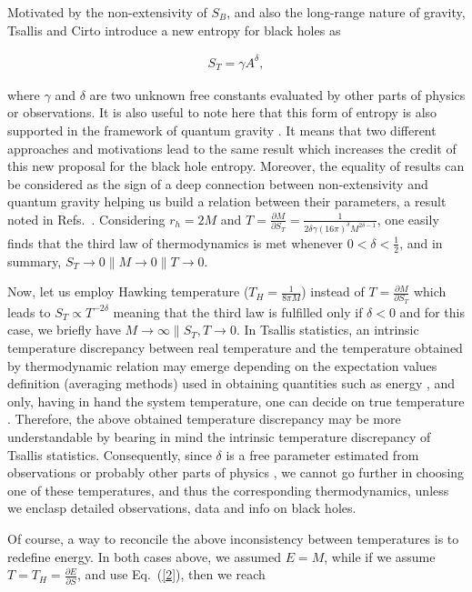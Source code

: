 \documentclass[twocolumn,preprintnumbers,amsmath,nofootinbib,amssymb]{revtex4}
\begin{document}
Motivated by the non-extensivity of $S_B$, and also the long-range
nature of gravity, Tsallis and Cirto \cite{tsallis} introduce a
new entropy for black holes as

\begin{eqnarray}\label{2}
S_T=\gamma A^\delta,
\end{eqnarray}

\noindent where $\gamma$ and $\delta$ are two unknown free
constants evaluated by other parts of physics or observations. It
is also useful to note here that this form of entropy is also
supported in the framework of quantum gravity \cite{barrow}. It
means that two different approaches and motivations lead to the
same result which increases the credit of this new proposal for
the black hole entropy. Moreover, the equality of results can be
considered as the sign of a deep connection between
non-extensivity and quantum gravity helping us build a relation
between their parameters, a result noted in Refs.~\cite{epl,homa}.
Considering $r_h=2M$ and $T=\frac{\partial M}{\partial
S_T}=\frac{1}{2\delta\gamma(16\pi)^\delta M^{2\delta-1}}$, one
easily finds that the third law of thermodynamics is met whenever
$0<\delta<\frac{1}{2}$, and in summary, $S_T\rightarrow0\parallel
M\rightarrow0\parallel T\rightarrow0$.

Now, let us employ Hawking temperature ($T_H=\frac{1}{8\pi M}$)
instead of $T=\frac{\partial M}{\partial S_T}$ which leads to
$S_T\propto T^{-2\delta}$ meaning that the third law is fulfilled
only if $\delta<0$ and for this case, we briefly have
$M\rightarrow\infty\parallel S_T,T\rightarrow0$. In Tsallis
statistics, an intrinsic temperature discrepancy between real
temperature and the temperature obtained by thermodynamic relation
may emerge depending on the expectation values definition
(averaging methods) used in obtaining quantities such as energy
\cite{kol}, and only, having in hand the system temperature, one
can decide on true temperature \cite{kol}. Therefore, the above
obtained temperature discrepancy may be more understandable by
bearing in mind the intrinsic temperature discrepancy of Tsallis
statistics. Consequently, since $\delta$ is a free parameter
estimated from observations \cite{revT,masi} or probably other
parts of physics \cite{epl,homa}, we cannot go further in choosing
one of these temperatures, and thus the corresponding
thermodynamics, unless we enclasp detailed observations, data and
info on black holes.

Of course, a way to reconcile the above inconsistency between
temperatures is to redefine energy. In both cases above, we
assumed $E=M$, while if we assume $T=T_H=\frac{\partial
E}{\partial S}$, and use Eq.~(\ref{2}), then we reach
\end{document}

